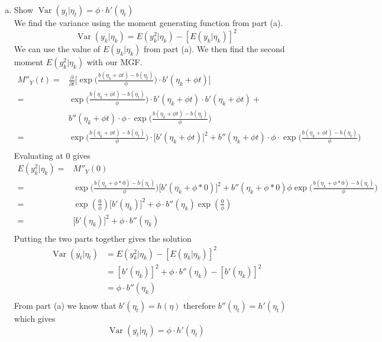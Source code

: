 \documentclass{article}
\newcommand{\pd}[2]{\frac{\partial#1}{\partial#2}}
\newcommand{\var}{\mathop{\mathrm{Var}}}
\begin{document}
\begin{enumerate}[(a)]
\item Show $\var(y_t|\eta_t) = \phi\cdot h'(\eta_t)$\\
We find the variance using the moment generating function from part (a).
$$\var(y_k|\eta_k) = E(y^2_k|\eta_k) - [E(y_k|\eta_k)]^2$$
We can use the value of $E(y_k|\eta_k)$ from part (a). We then find the second moment $E(y^2_k|\eta_k)$ with our MGF.
\begin{align*}
M''_Y(t) =& \pd{}{t} \bigg[\exp\bigg(\frac{b(\eta_k + \phi t) - b(\eta_t)}{\phi}\bigg)\cdot b'(\eta_k + \phi t)\bigg]\\
=& \exp\bigg(\frac{b(\eta_k + \phi t) - b(\eta_t)}{\phi}\bigg)\cdot b'(\eta_k + \phi t)\cdot b'(\eta_k + \phi t) +\\
& b''(\eta_k + \phi t)\cdot\phi\cdot\exp\bigg(\frac{b(\eta_k + \phi t) - b(\eta_t)}{\phi}\bigg)\\
=& \exp\bigg(\frac{b(\eta_k + \phi t) - b(\eta_t)}{\phi}\bigg)\cdot \bigg[b'(\eta_k + \phi t)\bigg]^2 + b''(\eta_k + \phi t)\cdot\phi\cdot\exp\bigg(\frac{b(\eta_k + \phi t) - b(\eta_t)}{\phi}\bigg)\\
\end{align*}
Evaluating at 0 gives
\begin{align*}
 E(y^2_k|\eta_k) =& M''_Y(0)\\
=& \exp\bigg(\frac{b(\eta_k + \phi *0) - b(\eta_t)}{\phi}\bigg)\bigg[b'(\eta_k + \phi *0)\bigg]^2 + b''(\eta_k + \phi *0)\phi\exp\bigg(\frac{b(\eta_k + \phi *0) - b(\eta_t)}{\phi}\bigg)\\
=& \exp(\frac{0}{\phi})\bigg[b'(\eta_k)\bigg]^2 + \phi \cdot b''(\eta_k)\exp(\frac{0}{\phi})\\
=& \bigg[b'(\eta_k)\bigg]^2 + \phi \cdot b''(\eta_k)\\
\end{align*}
Putting the two parts together gives the solution
\begin{align*}
\var(y_t|\eta_t) &= E(y^2_k|\eta_k) -  [E(y_k|\eta_k)]^2\\
&= [b'(\eta_k)]^2 + \phi \cdot b''(\eta_k) -  [b'(\eta_k)]^2\\
&= \phi \cdot b''(\eta_k)\\
\end{align*}
From part (a) we know that $b'(\eta_t) = h(\eta)$ therefore $b''(\eta_t) = h'(\eta_t)$ which gives
$$\var(y_t|\eta_t) = \phi\cdot h'(\eta_t)$$


\end{enumerate}
\end{document}
